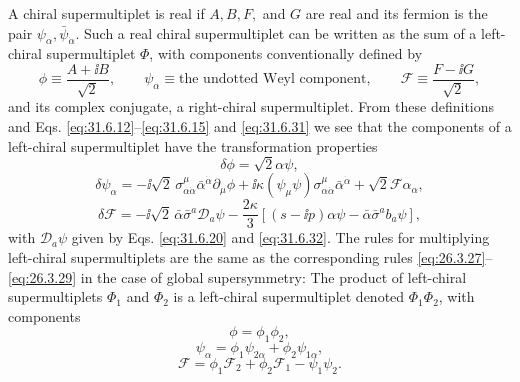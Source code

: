 A chiral supermultiplet is real if \(A,B,F,\) and \(G\) are real and its
fermion is the pair \(\psi_\alpha,\bar\psi_{\dot\alpha}\). Such a real
chiral supermultiplet can be
written as the sum of a left-chiral supermultiplet \(\Phi\), with
components conventionally defined by
\begin{equation}
  \phi\equiv\frac{A+\ii B}{\sqrt{2}},\qquad
  \psi_\alpha\equiv\text{the undotted Weyl component},\qquad
  \mathcal F\equiv\frac{F-\ii G}{\sqrt{2}},
  \tag{31.6.33}\label{eq:31.6.33}
\end{equation}
and its complex conjugate, a right-chiral supermultiplet. From these
definitions and Eqs. \eqref{eq:31.6.12}--\eqref{eq:31.6.15} and
\eqref{eq:31.6.31} we see that the components of a left-chiral
supermultiplet have the transformation properties
\begin{equation}
  \delta\phi=\sqrt{2}\alpha\psi,
  \tag{31.6.34}\label{eq:31.6.34}
\end{equation}
\begin{equation}
  \delta\psi_\alpha
  =-\ii\sqrt{2}\,
    \sigma^\mu_{\alpha\dot\alpha}\bar\alpha^{\dot\alpha}
    \partial_\mu\phi
   +\ii\kappa(\psi_\mu\psi)
    \sigma^\mu_{\alpha\dot\alpha}\bar\alpha^{\dot\alpha}
   +\sqrt{2}\mathcal F\alpha_\alpha,
  \tag{31.6.35}\label{eq:31.6.35}
\end{equation}
\begin{equation}
  \delta\mathcal F
  =-\ii\sqrt{2}\,
    \bar\alpha\bar\sigma^a\mathcal D_a\psi
   -\frac{2\kappa}{3}
    \left[
      (s-\ii p)\alpha\psi
      -\bar\alpha\bar\sigma^ab_a\psi
    \right],
  \tag{31.6.36}\label{eq:31.6.36}
\end{equation}
with \(\mathcal D_a\psi\) given by Eqs. \eqref{eq:31.6.20} and
\eqref{eq:31.6.32}. The rules for multiplying left-chiral
supermultiplets are the same as the corresponding rules
\eqref{eq:26.3.27}--\eqref{eq:26.3.29} in the case of global
supersymmetry: The product of left-chiral supermultiplets \(\Phi_1\)
and \(\Phi_2\) is a left-chiral supermultiplet denoted
\(\Phi_1\Phi_2\), with components
\begin{equation}
  \phi=\phi_1\phi_2,
  \tag{31.6.37}\label{eq:31.6.37}
\end{equation}
\begin{equation}
  \psi_\alpha=\phi_1\psi_{2\alpha}+\phi_2\psi_{1\alpha},
  \tag{31.6.38}\label{eq:31.6.38}
\end{equation}
\begin{equation}
  \mathcal F
  =\phi_1\mathcal F_2+\phi_2\mathcal F_1
   -\psi_1\psi_2.
  \tag{31.6.39}\label{eq:31.6.39}
\end{equation}

